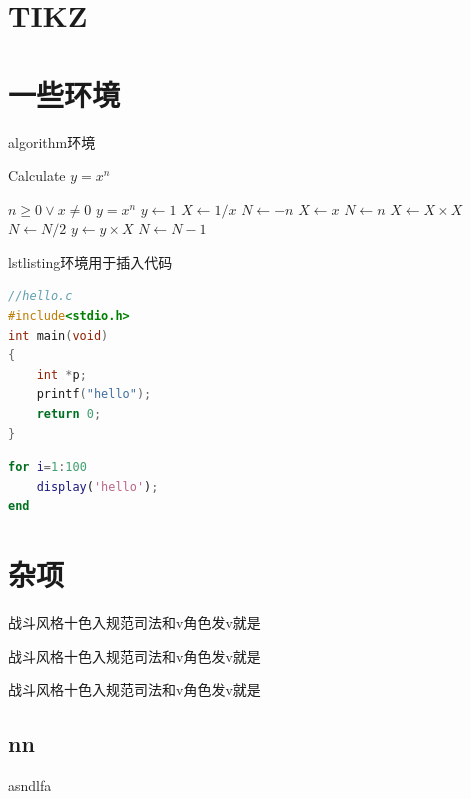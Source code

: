 \documentclass[bachelor]{XJTUthesis}
\begin{document}
\chapter{TIKZ}

\chapter{一些环境}
algorithm环境
\begin{algorithm}
    \caption{Calculate $y = x^n$}
    \label{alg1}
    \begin{algorithmic}
        \REQUIRE $n \geq 0 \vee x \neq 0$
        \ENSURE $y = x^n$
        \STATE $y \leftarrow 1$
        \STATE $X \leftarrow 1 / x$
        \STATE $N \leftarrow -n$
        \ELSE
        \STATE $X \leftarrow x$
        \STATE $N \leftarrow n$
        \ENDIF
        \STATE $X \leftarrow X \times X$
        \STATE $N \leftarrow N / 2$
        \ELSE[$N$ is odd]
        \STATE $y \leftarrow y \times X$
        \STATE $N \leftarrow N - 1$
        \ENDIF
        \ENDWHILE
    \end{algorithmic}
\end{algorithm}

lstlisting环境用于插入代码
\begin{lstlisting}[language=c++]
//hello.c
#include<stdio.h>
int main(void)
{
    int *p;
    printf("hello");
    return 0;
}
\end{lstlisting}

\begin{lstlisting}[language=matlab]
for i=1:100
    display('hello');
end
\end{lstlisting}

\chapter{杂项}

\begin{appendixs}
战斗风格十色入规范司法和v角色发v就是
\end{appendixs}

\begin{appendixs}
战斗风格十色入规范司法和v角色发v就是
\end{appendixs}

\begin{appendixs}
战斗风格十色入规范司法和v角色发v就是
\section{nn}
asndlfa
\end{appendixs}

\begin{acknowledgement}
\chaptername
\end{acknowledgement}

\printbibliography[heading=bibliography,title=参考文献]
\end{document}
